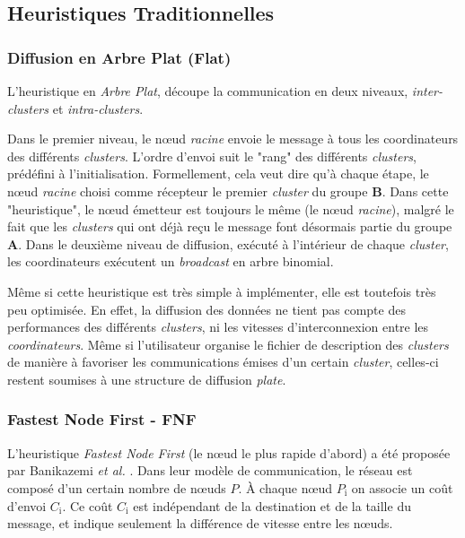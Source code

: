 \subsection*{Heuristiques Traditionnelles}

\subsubsection*{Diffusion en Arbre Plat (Flat)}

L'heuristique en \emph{Arbre Plat}, découpe la communication en deux niveaux, \emph{inter-clusters}
et \emph{intra-clusters}. 

Dans le premier niveau, le n{\oe}ud \emph{racine} envoie le message
à tous les coordinateurs des différents \textit{clusters}. L'ordre d'envoi
suit le "rang" des différents \textit{clusters}, prédéfini à l'initialisation.
Formellement, cela veut dire qu'à chaque étape, le n{\oe}ud \emph{racine}
choisi comme récepteur le premier  \textit{cluster} du groupe \textbf{B}. Dans
cette "heuristique", le n{\oe}ud émetteur est toujours
le même (le n{\oe}ud \emph{racine}), malgré le fait que les  \textit{clusters}
qui ont déjà reçu le message font désormais partie du groupe \textbf{A}.
Dans le deuxième niveau de diffusion, exécuté à l'intérieur de chaque
 \textit{cluster}, les coordinateurs exécutent un \emph{broadcast} en arbre binomial.

Même si cette heuristique est très simple à implémenter, elle est toutefois
très peu optimisée. En effet, la diffusion des données ne tient pas
compte des performances des différents  \textit{clusters}, ni les vitesses d'interconnexion
entre les \emph{coordinateurs}. Même si l'utilisateur organise le
fichier de description des  \textit{clusters} de manière à favoriser les communications
émises d'un certain  \textit{cluster}, celles-ci restent soumises à une structure
de diffusion \emph{plate}. 


\subsubsection*{Fastest Node First - FNF}

L'heuristique \emph{Fastest Node First} (le n{\oe}ud le plus rapide d'abord)
a été proposée par Banikazemi \emph{et al.} \cite{Banikazemi98}.
Dans leur modèle de communication, le réseau est composé d'un certain
nombre de n{\oe}uds \emph{$P$}. À chaque n{\oe}ud \emph{$P_{\textrm{i}}$}
on associe un coût d'envoi \emph{$C_{\textrm{i}}$}. Ce coût \emph{$C_{\textrm{i}}$}
est indépendant de la destination et de la taille du message, et indique
seulement la différence de vitesse entre les n{\oe}uds.

